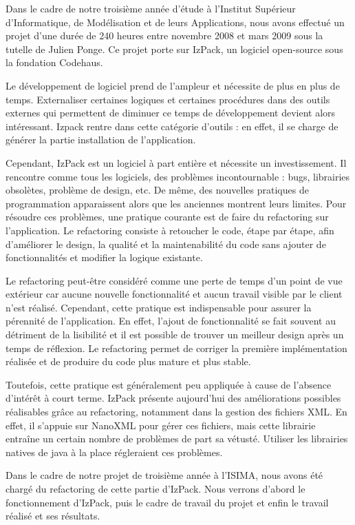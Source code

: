 Dans le cadre de notre troisième année d'étude à l'Institut Supérieur d'Informatique, de Modélisation et de leurs Applications, nous avons effectué un projet d'une durée de 240 heures entre novembre 2008 et mars 2009 sous la tutelle de Julien Ponge.
Ce projet porte sur IzPack, un logiciel open-source sous la fondation Codehaus.

Le développement de logiciel prend de l'ampleur et nécessite de plus en plus de temps.
Externaliser certaines logiques et certaines procédures dans des outils externes qui permettent de diminuer ce temps de développement devient alors intéressant.
Izpack rentre dans cette catégorie d'outils : en effet, il se charge de générer la partie installation de l'application.

Cependant, IzPack est un logiciel à part entière et nécessite un investissement.
Il rencontre comme tous les logiciels, des problèmes incontournable : bugs, librairies obsolètes, problème de design, etc.
De même, des nouvelles pratiques de programmation apparaissent alors que les anciennes montrent leurs limites.
Pour résoudre ces problèmes, une pratique courante est de faire du refactoring sur l'application.
Le refactoring consiste à retoucher le code, étape par étape, afin d'améliorer le design, la qualité et la maintenabilité du code sans ajouter de fonctionnalités et modifier la logique existante.

Le refactoring peut-être considéré comme une perte de temps d'un point de vue extérieur car aucune nouvelle fonctionnalité et aucun travail visible par le client n'est réalisé.
Cependant, cette pratique est indispensable pour assurer la pérennité de l'application.
En effet, l'ajout de fonctionnalité se fait souvent au détriment de la lisibilité et il est possible de trouver un meilleur design après un temps de réflexion.
Le refactoring permet de corriger la première implémentation réalisée et de produire du code plus mature et plus stable.

Toutefois, cette pratique est généralement peu appliquée à cause de l'absence d'intérêt à court terme.
IzPack présente aujourd'hui des améliorations possibles réalisables grâce au refactoring, notamment dans la gestion des fichiers XML.
En effet, il s'appuie sur NanoXML pour gérer ces fichiers, mais cette librairie entraîne un certain nombre de problèmes de part sa vétusté.
Utiliser les librairies natives de java à la place régleraient ces problèmes.

Dans le cadre de notre projet de troisième année à l'ISIMA, nous avons été chargé du refactoring de cette partie d'IzPack.
Nous verrons d'abord le fonctionnement d'IzPack, puis le cadre de travail du projet et enfin le travail réalisé et ses résultats.